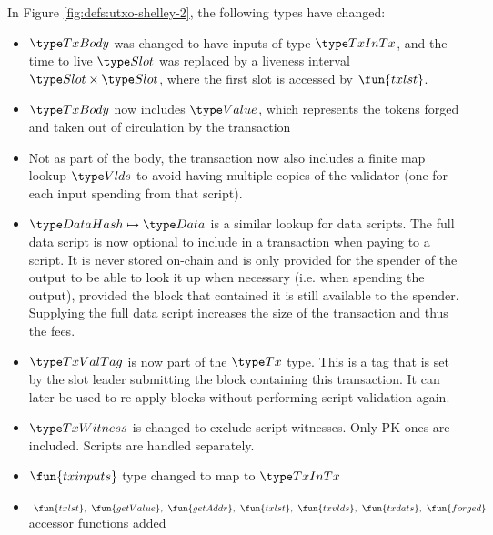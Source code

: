 In Figure \ref{fig:defs:utxo-shelley-2}, the following types have changed:

\begin{itemize}
  \item $\TxBody$ was changed to have inputs of type $\TxInTx$, and the
  time to live $\Slot$ was replaced by a liveness interval $\Slot \times \Slot$,
  where the first slot is accessed by $\fun{txlst}$.
  \item $\TxBody$ now includes $\Value$, which represents
  the tokens forged and taken out of circulation by the transaction
  \item Not as part of the body, the transaction now also includes
  a finite map lookup $\Vlds$ to avoid having multiple
  copies of the validator (one for each input spending from that script).
  \item $\HashDat \mapsto \Data$ is a similar lookup for data scripts.
  The full data script is now optional to include in a transaction when
  paying to a script. It is never
  stored on-chain and is only provided for the spender of the output
  to be able to look it up when necessary (i.e. when spending the output),
  provided the block that contained it is still available to the spender.
  Supplying the full data script increases the size of the transaction and
  thus the fees.
  \item $\TxValTag$ is now part of the $\Tx$ type. This is a tag that is
  set by the slot leader submitting the block containing this transaction.
  It can later be used to re-apply blocks without performing script validation
  again.
  \item $\TxWitness$ is changed to exclude script witnesses. Only PK ones
  are included. Scripts are handled separately.
  \item $\fun{txinputs}$ type changed to map to $\TxInTx$
  \item $~\fun{txlst},~\fun{getValue},~\fun{getAddr},~\fun{txlst},~\fun{txvlds},~\fun{txdats},
  ~\fun{forged}$
  accessor functions added
\end{itemize}



